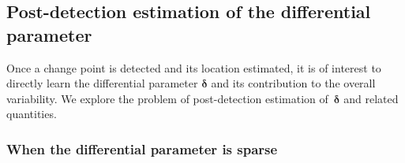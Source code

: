 \documentclass[11pt, a4paper]{article}
\theoremstyle{definition}
\theoremstyle{definition}
\theoremstyle{definition}
\theoremstyle{definition}
\theoremstyle{definition}
\theoremstyle{remark}
\theoremstyle{definition}
\theoremstyle{definition}
\theoremstyle{definition}
\begin{document}
\subsection{Post-detection estimation of the differential parameter}
\label{sec:post}

Once a change point is detected and its location estimated, it is of interest to directly learn the differential parameter $\bm\delta$ and its contribution to the overall variability.
We explore the problem of post-detection estimation of~$\bm\delta$ and related quantities.

\subsubsection{When the differential parameter is sparse}
\label{sec:post:sparse}
\end{document}
